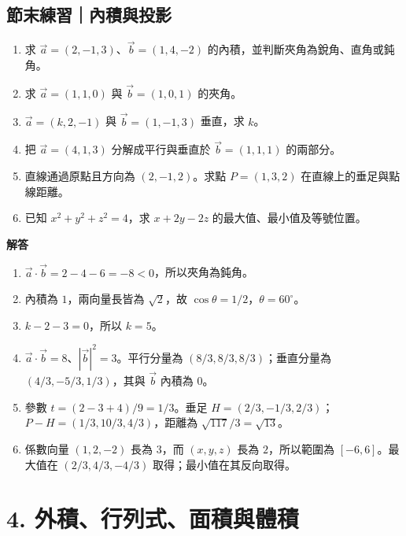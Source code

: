 \documentclass[11pt,a4paper]{article}
\providecommand{\tightlist}{%
  \setlength{\itemsep}{0pt}\setlength{\parskip}{0pt}}
\begin{document}
\begin{HandoutSelfCheck}

\subsection{節末練習｜內積與投影}\label{ux7bc0ux672bux7df4ux7fd2ux5167ux7a4dux8207ux6295ux5f71}

\begin{enumerate}
\def\labelenumi{\arabic{enumi}.}
\tightlist
\item
  求 \(\vec a=(2,-1,3)\)、\(\vec b=(1,4,-2)\) 的內積，並判斷夾角為銳角、直角或鈍角。
\item
  求 \(\vec a=(1,1,0)\) 與 \(\vec b=(1,0,1)\) 的夾角。
\item
  \(\vec a=(k,2,-1)\) 與 \(\vec b=(1,-1,3)\) 垂直，求 \(k\)。
\item
  把 \(\vec a=(4,1,3)\) 分解成平行與垂直於 \(\vec b=(1,1,1)\) 的兩部分。
\item
  直線通過原點且方向為 \((2,-1,2)\)。求點 \(P=(1,3,2)\) 在直線上的垂足與點線距離。
\item
  已知 \(x^2+y^2+z^2=4\)，求 \(x+2y-2z\) 的最大值、最小值及等號位置。
\end{enumerate}

\textbf{解答}

\begin{enumerate}
\def\labelenumi{\arabic{enumi}.}
\tightlist
\item
  \(\vec a\cdot\vec b=2-4-6=-8<0\)，所以夾角為鈍角。
\item
  內積為 \(1\)，兩向量長皆為 \(\sqrt2\)，故 \(\cos\theta=1/2\)，\(\theta=60^\circ\)。
\item
  \(k-2-3=0\)，所以 \(k=5\)。
\item
  \(\vec a\cdot\vec b=8\)、\(|\vec b|^2=3\)。平行分量為 \((8/3,8/3,8/3)\)；垂直分量為 \((4/3,-5/3,1/3)\)，其與 \(\vec b\) 內積為 \(0\)。
\item
  參數 \(t=(2-3+4)/9=1/3\)。垂足 \(H=(2/3,-1/3,2/3)\)；\(P-H=(1/3,10/3,4/3)\)，距離為 \(\sqrt{117}/3=\sqrt{13}\)。
\item
  係數向量 \((1,2,-2)\) 長為 \(3\)，而 \((x,y,z)\) 長為 \(2\)，所以範圍為 \([-6,6]\)。最大值在 \((2/3,4/3,-4/3)\) 取得；最小值在其反向取得。
\end{enumerate}

\end{HandoutSelfCheck}

\section{4. 外積、行列式、面積與體積}\label{ux5916ux7a4dux884cux5217ux5f0fux9762ux7a4dux8207ux9ad4ux7a4d}
\end{document}

